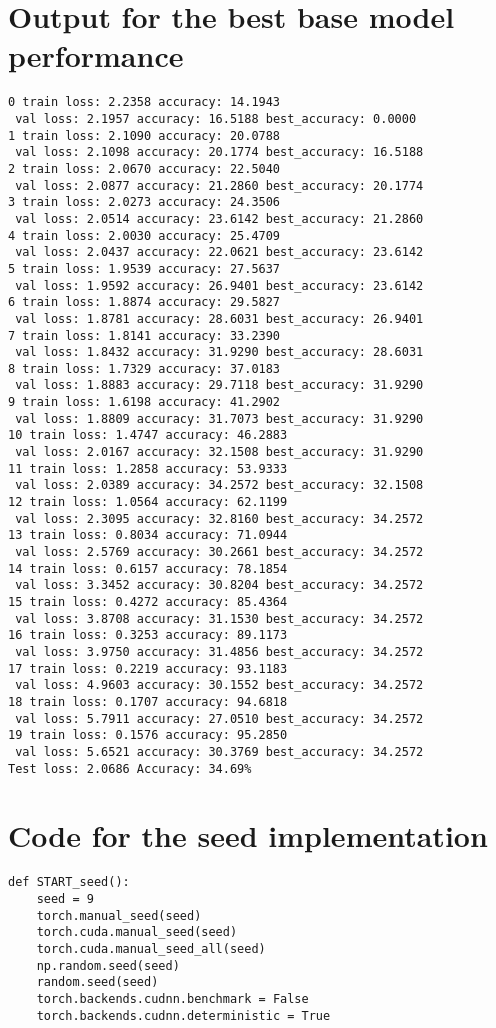 \documentclass{article} %
\begin{document}
\section{Output for the best base model performance}
\label{app:bestBase}
\begin{lstlisting}
0 train loss: 2.2358 accuracy: 14.1943
 val loss: 2.1957 accuracy: 16.5188 best_accuracy: 0.0000
1 train loss: 2.1090 accuracy: 20.0788
 val loss: 2.1098 accuracy: 20.1774 best_accuracy: 16.5188
2 train loss: 2.0670 accuracy: 22.5040
 val loss: 2.0877 accuracy: 21.2860 best_accuracy: 20.1774
3 train loss: 2.0273 accuracy: 24.3506
 val loss: 2.0514 accuracy: 23.6142 best_accuracy: 21.2860
4 train loss: 2.0030 accuracy: 25.4709
 val loss: 2.0437 accuracy: 22.0621 best_accuracy: 23.6142
5 train loss: 1.9539 accuracy: 27.5637
 val loss: 1.9592 accuracy: 26.9401 best_accuracy: 23.6142
6 train loss: 1.8874 accuracy: 29.5827
 val loss: 1.8781 accuracy: 28.6031 best_accuracy: 26.9401
7 train loss: 1.8141 accuracy: 33.2390
 val loss: 1.8432 accuracy: 31.9290 best_accuracy: 28.6031
8 train loss: 1.7329 accuracy: 37.0183
 val loss: 1.8883 accuracy: 29.7118 best_accuracy: 31.9290
9 train loss: 1.6198 accuracy: 41.2902
 val loss: 1.8809 accuracy: 31.7073 best_accuracy: 31.9290
10 train loss: 1.4747 accuracy: 46.2883
 val loss: 2.0167 accuracy: 32.1508 best_accuracy: 31.9290
11 train loss: 1.2858 accuracy: 53.9333
 val loss: 2.0389 accuracy: 34.2572 best_accuracy: 32.1508
12 train loss: 1.0564 accuracy: 62.1199
 val loss: 2.3095 accuracy: 32.8160 best_accuracy: 34.2572
13 train loss: 0.8034 accuracy: 71.0944
 val loss: 2.5769 accuracy: 30.2661 best_accuracy: 34.2572
14 train loss: 0.6157 accuracy: 78.1854
 val loss: 3.3452 accuracy: 30.8204 best_accuracy: 34.2572
15 train loss: 0.4272 accuracy: 85.4364
 val loss: 3.8708 accuracy: 31.1530 best_accuracy: 34.2572
16 train loss: 0.3253 accuracy: 89.1173
 val loss: 3.9750 accuracy: 31.4856 best_accuracy: 34.2572
17 train loss: 0.2219 accuracy: 93.1183
 val loss: 4.9603 accuracy: 30.1552 best_accuracy: 34.2572
18 train loss: 0.1707 accuracy: 94.6818
 val loss: 5.7911 accuracy: 27.0510 best_accuracy: 34.2572
19 train loss: 0.1576 accuracy: 95.2850
 val loss: 5.6521 accuracy: 30.3769 best_accuracy: 34.2572
Test loss: 2.0686 Accuracy: 34.69%
\end{lstlisting}

\section{Code for the seed implementation}
\label{app:seed}
\begin{lstlisting}
def START_seed():
    seed = 9
    torch.manual_seed(seed)
    torch.cuda.manual_seed(seed)
    torch.cuda.manual_seed_all(seed)
    np.random.seed(seed)
    random.seed(seed)
    torch.backends.cudnn.benchmark = False
    torch.backends.cudnn.deterministic = True

\end{lstlisting}    
\end{document}
